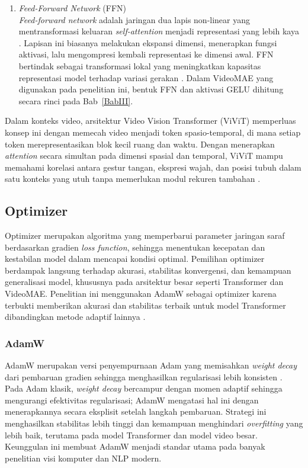 \begin{enumerate}
	\item \textit{Feed-Forward Network} (FFN)\\
	\textit{Feed-forward network} adalah jaringan dua lapis non-linear yang mentransformasi keluaran \textit{self-attention} menjadi representasi yang lebih kaya \cite{IGoodfellow2016}. Lapisan ini biasanya melakukan ekspansi dimensi, menerapkan fungsi aktivasi, lalu mengompresi kembali representasi ke dimensi awal. FFN bertindak sebagai transformasi lokal yang meningkatkan kapasitas representasi model terhadap variasi gerakan \cite{Vaswani2023}. Dalam VideoMAE yang digunakan pada penelitian ini, bentuk FFN dan aktivasi GELU dihitung secara rinci pada Bab~\ref{BabIII}.\par

\end{enumerate}
\vspace{0.5cm}
Dalam konteks video, arsitektur Video Vision Transformer (ViViT) \cite{Arnab2021} memperluas konsep ini dengan memecah video menjadi token spasio-temporal, di mana setiap token merepresentasikan blok kecil ruang dan waktu. Dengan menerapkan \textit{attention} secara simultan pada dimensi spasial dan temporal, ViViT mampu memahami korelasi antara gestur tangan, ekspresi wajah, dan posisi tubuh dalam satu konteks yang utuh tanpa memerlukan modul rekuren tambahan \cite{Vaswani2023,Arnab2021}.\par

\subsection{Optimizer}\label{II.Optimizer}

Optimizer merupakan algoritma yang memperbarui parameter jaringan saraf berdasarkan gradien \textit{loss function}, sehingga menentukan kecepatan dan kestabilan model dalam mencapai kondisi optimal. Pemilihan optimizer berdampak langsung terhadap akurasi, stabilitas konvergensi, dan kemampuan generalisasi model, khususnya pada arsitektur besar seperti Transformer dan VideoMAE. Penelitian ini menggunakan AdamW sebagai optimizer karena terbukti memberikan akurasi dan stabilitas terbaik untuk model Transformer dibandingkan metode adaptif lainnya \cite{Selvakumari2025}.

\subsubsection{AdamW}
AdamW merupakan versi penyempurnaan Adam yang memisahkan \textit{weight decay} dari pembaruan gradien sehingga menghasilkan regularisasi lebih konsisten \cite{Loshchilov2017}. Pada Adam klasik, \textit{weight decay} bercampur dengan momen adaptif sehingga mengurangi efektivitas regularisasi; AdamW mengatasi hal ini dengan menerapkannya secara eksplisit setelah langkah pembaruan. Strategi ini menghasilkan stabilitas lebih tinggi dan kemampuan menghindari \textit{overfitting} yang lebih baik, terutama pada model Transformer dan model video besar. Keunggulan ini membuat AdamW menjadi standar utama pada banyak penelitian visi komputer dan NLP modern.

